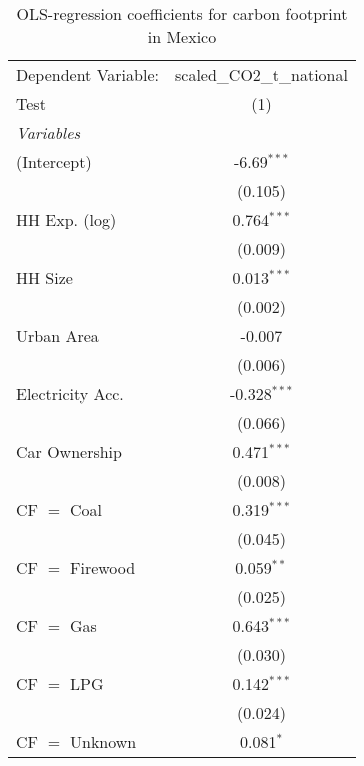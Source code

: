
\begin{table}[htbp!]
   \centering
   \small
   \begin{adjustbox}{width = 1\textwidth, max height = 0.95\textheight, center}
      \begin{threeparttable}[b]
         \caption{\label{tab:OLS_2_MEX} OLS-regression coefficients for carbon footprint in Mexico}
         \begin{tabular}{lc}
            \tabularnewline \midrule \midrule
            Dependent Variable: & scaled\_CO2\_t\_national\\     
            Test                & (1)\\  
            \midrule
            \emph{Variables}\\
            (Intercept)         & -6.69$^{***}$\\   
                                & (0.105)\\   
            HH Exp. (log)       & 0.764$^{***}$\\   
                                & (0.009)\\   
            HH Size             & 0.013$^{***}$\\   
                                & (0.002)\\   
            Urban Area          & -0.007\\   
                                & (0.006)\\   
            Electricity Acc.    & -0.328$^{***}$\\   
                                & (0.066)\\   
            Car Ownership       & 0.471$^{***}$\\   
                                & (0.008)\\   
            CF $=$ Coal         & 0.319$^{***}$\\   
                                & (0.045)\\   
            CF $=$ Firewood     & 0.059$^{**}$\\   
                                & (0.025)\\   
            CF $=$ Gas          & 0.643$^{***}$\\   
                                & (0.030)\\   
            CF $=$ LPG          & 0.142$^{***}$\\   
                                & (0.024)\\   
            CF $=$ Unknown      & 0.081$^{*}$\\   

\end{tabular}
\end{threeparttable}
\end{adjustbox}
\end{table}
